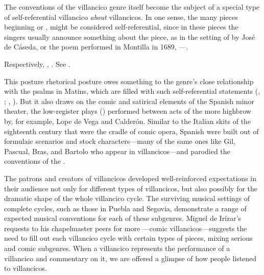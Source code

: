 The conventions of the villancico genre itself become the subject of a special
type of self-referential villancico \emph{about} villancicos.
In one sense, the many pieces beginning  or , might be considered self-referential, since in these pieces the
singers usually announce something about the piece, as in the setting of
 by José de Cáseda, or the poem performed in
Montilla in 1689, ---.%
    \begin{Footnote}
    Respectively, , \autocite[116 (no signature
    listed)]{BNE:VCs17C}.
    See .
    \end{Footnote}
This posture rhetorical posture owes something to the genre's close
relationship with the psalms in Matins, which are filled with such
self-referential statements (,
; ,
).
But it also draws on the comic and satirical elements of the Spanish minor
theater, the low-register plays () performed between acts of
the more highbrow  by, for example, Lope de Vega and Calderón.%
    \citXXX[entremeses]
Similar to the Italian  skits of the eighteenth
century that were the cradle of comic opera, Spanish  were
built out of formulaic scenarios and stock characters---many of the same ones
like Gil, Pascual, Bras, and Bartolo who appear in villancicos---and parodied
the conventions of the .

The patrons and creators of villancicos developed well-reinforced expectations
in their audience not only for different types of villancicos, but also
possibly for the dramatic shape of the whole villancico cycle.
The surviving musical settings of complete cycles, such as those in Puebla and
Segovia, demonstrate a range of expected musical conventions for each of these
subgenres.
Miguel de Irízar's requests to his chapelmaster peers for more
---comic villancicos---suggests the need to fill
out each villancico cycle with certain types of pieces, mixing serious and
comic subgenres.%
    \Autocite[78]{Olarte:Irizar} 
When a villancico represents the performance of a villancico and commentary on
it, we are offered a glimpse of how people listened to villancicos.

